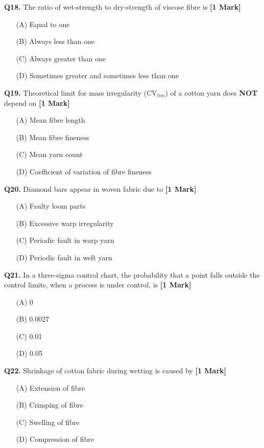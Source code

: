 \documentclass[11pt]{article}
\newcommand{\questiona}[2]{
    \noindent\textbf{Q#2.} #1 \hfill \textbf{[1 Mark]}
}
\begin{document}
\questiona{The ratio of wet-strength to dry-strength of viscose fibre is}{18}
\begin{enumerate}
    \item[(A)] Equal to one  
    \item[(B)] Always less than one  
    \item[(C)] Always greater than one  
    \item[(D)] Sometimes greater and sometimes less than one  
\end{enumerate}
\vspace{0.5cm}

\questiona{Theoretical limit for mass irregularity (CV\(_{lim}\)) of a cotton yarn does \textbf{NOT} depend on}{19}
\begin{enumerate}
    \item[(A)] Mean fibre length  
    \item[(B)] Mean fibre fineness  
    \item[(C)] Mean yarn count  
    \item[(D)] Coefficient of variation of fibre fineness  
\end{enumerate}
\vspace{0.5cm}

\questiona{Diamond bars appear in woven fabric due to}{20}
\begin{enumerate}
    \item[(A)] Faulty loom parts  
    \item[(B)] Excessive warp irregularity  
    \item[(C)] Periodic fault in warp yarn  
    \item[(D)] Periodic fault in weft yarn  
\end{enumerate}
\vspace{0.5cm}

\questiona{In a three-sigma control chart, the probability that a point falls outside the control limits, when a process is under control, is}{21}
\begin{enumerate}
    \item[(A)] 0  
    \item[(B)] 0.0027  
    \item[(C)] 0.01  
    \item[(D)] 0.05  
\end{enumerate}
\vspace{0.5cm}

\questiona{Shrinkage of cotton fabric during wetting is caused by}{22}
\begin{enumerate}
    \item[(A)] Extension of fibre  
    \item[(B)] Crimping of fibre  
    \item[(C)] Swelling of fibre  
    \item[(D)] Compression of fibre  
\end{enumerate}
\vspace{0.5cm}
\end{document}
